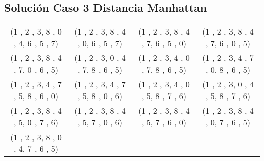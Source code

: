 \documentclass[11pt]{article}
\begin{document}
\subsection{Solución Caso 3 Distancia Manhattan}
\begin{tabular}{c c c c}
(1 , 2 , 3,
8 , 0 , 4,
6 , 5 , 7)
&

(1 , 2 , 3,
8 , 4 , 0,
6 , 5 , 7)
&

(1 , 2 , 3,
8 , 4 , 7,
6 , 5 , 0)
&

(1 , 2 , 3,
8 , 4 , 7,
6 , 0 , 5)
\\


(1 , 2 , 3,
8 , 4 , 7,
0 , 6 , 5)
&

(1 , 2 , 3,
0 , 4 , 7,
8 , 6 , 5)
&

(1 , 2 , 3,
4 , 0 , 7,
8 , 6 , 5)
&

(1 , 2 , 3,
4 , 7 , 0,
8 , 6 , 5)
\\

(1 , 2 , 3,
4 , 7 , 5,
8 , 6 , 0)
&

(1 , 2 , 3,
4 , 7 , 5,
8 , 0 , 6)
&

(1 , 2 , 3,
4 , 0 , 5,
8 , 7 , 6)
&

(1 , 2 , 3,
0 , 4 , 5,
8 , 7 , 6)
\\

(1 , 2 , 3,
8 , 4 , 5,
0 , 7 , 6)
&

(1 , 2 , 3,
8 , 4 , 5,
7 , 0 , 6)
&

(1 , 2 , 3,
8 , 4 , 5,
7 , 6 , 0)
&

(1 , 2 , 3,
8 , 4 , 0,
7 , 6 , 5)
\\

(1 , 2 , 3,
8 , 0 , 4,
7 , 6 , 5)
&

&

&

\\
\end{tabular}
\clearpage
\end{document}
